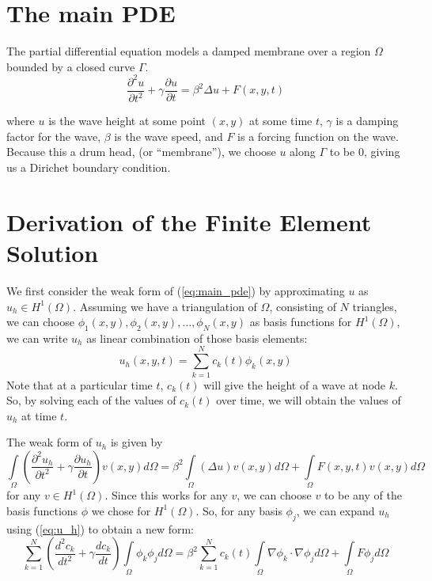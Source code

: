 \documentclass[a4paper,12pt]{article}
\begin{document}
\section{The main PDE}
The partial differential equation models a damped membrane over a region $\Omega$ bounded by a closed curve $\Gamma$.
\begin{equation} \label{eq:main_pde}
\frac{\partial^2u}{\partial t^2} + \gamma \frac{\partial u}{\partial t}
=
\beta^2 \Delta u + F(x,y,t)
\end{equation}

where $u$ is the wave height at some point $(x,y)$ at some time $t$, $\gamma$ is a damping factor for the wave,
$\beta$ is the wave speed, and $F$ is a forcing function on the wave. Because this a drum head, (or ``membrane''), we choose
$u$ along $\Gamma$ to be 0, giving us a Dirichet boundary condition.

\section{Derivation of the Finite Element Solution}
We first consider the weak form of (\ref{eq:main_pde}) by approximating $u$ as $u_h \in H^1(\Omega)$. Assuming we have
a triangulation of $\Omega$, consisting of $N$ triangles, we can choose 
$\phi_1(x,y), \phi_2(x,y), \ldots, \phi_N(x,y)$ as basis functions for $H^1(\Omega)$, we can write $u_h$ as linear
combination of those basis elements:
\begin{equation} \label{eq:u_h}
u_h(x,y,t) = \sum\limits_{k=1}^N c_k(t) \phi_k(x,y)
\end{equation}
Note that at a particular time $t$, $c_k(t)$ will give the height of a wave at node $k$. So, by solving each of the values
of $c_k(t)$ over time, we will obtain the values of $u_h$ at time $t$.

The weak form of $u_h$ is given by
\begin{equation} \label{eq:u_h_weak_form}
\int\limits_{\Omega} 
    \left( 
        \frac{\partial^2u_h}{\partial t^2} + \gamma \frac{\partial u_h}{\partial t}
    \right)
    v(x,y) d\Omega
    =
    \beta^2 \int\limits_{\Omega} \left( \Delta u \right) v(x,y) d\Omega
    + \int\limits_{\Omega} F(x,y,t)v(x,y) d\Omega
\end{equation}
for any $v \in H^1(\Omega)$. Since this works for any $v$, we can choose $v$ to be any of the basis functions $\phi$
we chose for $H^1(\Omega)$. So, for any basis $\phi_j$, we can expand $u_h$ using (\ref{eq:u_h}) to obtain a new form:
\begin{equation} \label{eq:u_h_weak_form_expanded}
\sum\limits_{k=1}^N \left( \frac{d^2c_k}{dt^2} + \gamma\frac{dc_k}{dt} \right) \int\limits_{\Omega} \phi_k\phi_j d\Omega
=
\beta^2\sum\limits_{k=1}^N c_k(t) \int\limits_{\Omega} \nabla \phi_k \cdot \nabla \phi_j d\Omega
+
\int\limits_{\Omega} F\phi_j d\Omega
\end{equation}
\end{document}
